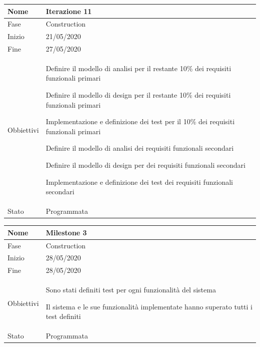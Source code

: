 \begin{center}
\begin{tabular}{ |p{2cm}|p{10cm}|  }
\hline
Nome & Iterazione 11 \\\hline
Fase & Construction \\\hline
Inizio & 21/05/2020 \\\hline
Fine &  27/05/2020  \\\hline
Obbiettivi & 
	\begin{compactitem}
		\item Definire il modello di analisi per il restante 10\% dei requisiti funzionali primari
		\item Definire il modello di design per il restante 10\% dei requisiti funzionali primari
		\item Implementazione e definizione dei test per il 10\% dei requisiti funzionali primari
		
		\item Definire il modello di analisi dei requisiti funzionali secondari
		\item Definire il modello di design per dei requisiti funzionali secondari
		\item Implementazione e definizione dei test dei requisiti funzionali secondari
		
	\end{compactitem}\\\hline
Stato &  Programmata \\\hline
\end{tabular}
\label{table:11}\newline


\begin{tabular}{ |p{2cm}|p{10cm}|  }
\hline
Nome & Milestone 3\\\hline
Fase & Construction \\\hline
Inizio & 28/05/2020 \\\hline
Fine &  28/05/2020 \\\hline
Obbiettivi & 
	\begin{compactitem}
		\item Sono stati definiti test per ogni funzionalità del sistema
		\item Il sistema e le sue funzionalità implementate hanno superato tutti i test definiti
	\end{compactitem}\\\hline
Stato &  Programmata \\\hline
\end{tabular}
\label{table:milestone3}\newline


\end{center}
